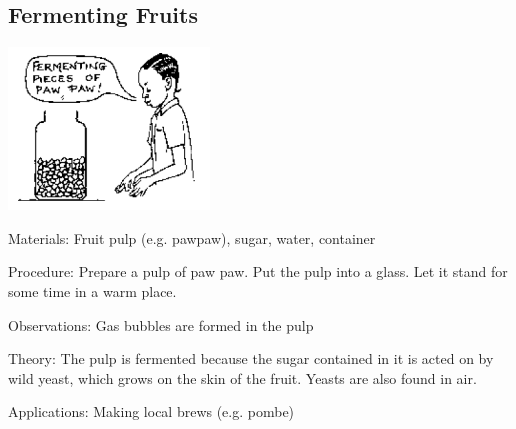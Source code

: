 \begin{multicols}{2}
\subsection{Fermenting Fruits} %

\begin{center}
\includegraphics[width=0.4\textwidth]{./img/source/fermenting-fruits.png}
\end{center}

\begin{description*}
\item[Materials:]{Fruit pulp (e.g. pawpaw), sugar, water, container}
\item[Procedure:]{Prepare a pulp of paw paw. Put the pulp into a glass. Let it stand for some time in a warm
place.}
\item[Observations:]{Gas bubbles are formed in the pulp}
\item[Theory:]{The pulp is fermented because the sugar contained in it is acted on by wild yeast, which
grows on the skin of the fruit. Yeasts are also found in air.}
\item[Applications:]{Making local brews (e.g. pombe)}
\end{description*}


\end{multicols}

\pagebreak